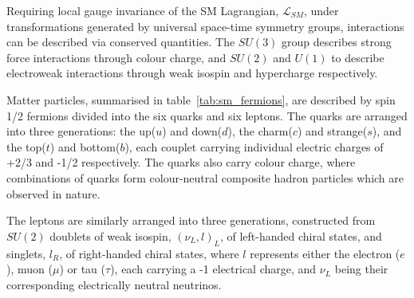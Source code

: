 Requiring local gauge invariance of the SM Lagrangian, $\mathcal{L}_{SM}$,
under
transformations generated by universal space-time symmetry groups,
interactions can be described via conserved quantities. The $SU(3)$ group
describes strong force interactions through colour charge, and $SU(2)$ and $U(1)$ to
describe electroweak interactions through weak isospin and hypercharge respectively.


Matter particles, summarised in table~\ref{tab:sm_fermions}, are described by
spin 1/2 fermions divided into the six quarks
and six leptons. The quarks are arranged into three generations: the up($u$) and
down($d$), the charm($c$) and strange($s$), and the top($t$) and bottom($b$),
each couplet carrying
individual electric charges of +2/3 and -1/2 respectively. The quarks also carry
colour charge, where combinations of quarks form colour-neutral composite
hadron particles which are observed in nature.


The leptons are similarly arranged into three generations, constructed from
$SU(2)$
doublets of weak isospin, $(\nu_L, l)_L$, of left-handed chiral states, and
singlets, $l_R$, of right-handed chiral states, where $l$ represents either the
electron ($e$), muon ($\mu$) or tau ($\tau$), each carrying a -1 electrical
charge, and $\nu_L$ being their corresponding electrically neutral neutrinos.


